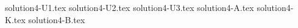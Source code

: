 \documentclass{article}
\begin{document}
{solution4-U1.tex}
{solution4-U2.tex}
{solution4-U3.tex}
{solution4-A.tex}
{solution4-K.tex}
{solution4-B.tex}
\end{document}
